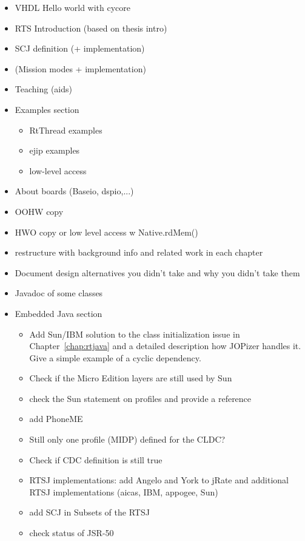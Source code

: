 \begin{itemize}
    \item VHDL Hello world with cycore
    \item RTS Introduction (based on thesis intro)
    \item SCJ definition (+ implementation)
    \item (Mission modes + implementation)
    \item Teaching (aids)
    \item Examples section
    \begin{itemize}
        \item RtThread examples
        \item ejip examples
        \item low-level access
    \end{itemize}
    \item About boards (Baseio, dspio,...)
    \item OOHW copy
    \item HWO copy or low level access w Native.rdMem()
    \item restructure with background info and related work in
        each chapter
    \item Document design alternatives you didn't take and why
        you didn't take them
    \item Javadoc of some classes
    \item Embedded Java section
    \begin{itemize}
        \item Add Sun/IBM solution to the class initialization issue in
        Chapter~\ref{chap:rtjava} and a detailed description how JOPizer
        handles it. Give a simple example of a cyclic dependency.
        \item Check if the Micro Edition layers are still used by
        Sun
        \item check the Sun statement on profiles and provide a
        reference
        \item add PhoneME
        \item Still only one profile (MIDP) defined for the CLDC?
        \item Check if CDC definition is still true
        \item RTSJ implementations: add Angelo and York to jRate and
        additional RTSJ implementations (aicas, IBM, appogee, Sun)
        \item add SCJ in Subsets of the RTSJ
        \item check status of JSR-50

\end{itemize}
\end{itemize}
